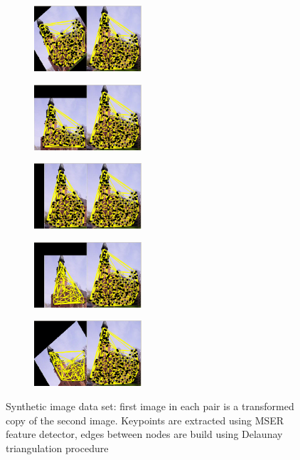 \begin{figure}[h] 
		\begin{subfigure}[b]{0.3\textwidth}
			\centering
			\includegraphics[width=4cm]{"chapter3/fig/ImageTrafo/Img_pair1"} 
			\caption{}\label{fig:ImageTrafo_initGraphs_a}
		\end{subfigure}
		\begin{subfigure}[b]{0.3\textwidth}
			\centering
			\includegraphics[width=4cm]{"chapter3/fig/ImageTrafo/Img_pair2"} 
			\caption{}
		\end{subfigure} 
		\begin{subfigure}[b]{0.3\textwidth}
			\centering
			\includegraphics[width=4cm]{"chapter3/fig/ImageTrafo/Img_pair3"}
			\caption{}
		\end{subfigure} 	
		\begin{subfigure}[b]{0.5\textwidth}
			\centering
			\includegraphics[width=4cm]{"chapter3/fig/ImageTrafo/Img_pair4"} 
			\caption{}
		\end{subfigure} 
		\begin{subfigure}[b]{0.5\textwidth}
			\centering
			\includegraphics[width=4cm]{"chapter3/fig/ImageTrafo/Img_pair5"}
			\caption{}
		\end{subfigure} 	
	\caption[Synthetic image data set]{Synthetic image data set: first image in each pair is a transformed copy of the second image. Keypoints are extracted using MSER feature detector, edges between nodes are build using Delaunay triangulation procedure}
	\label{fig:ImageTrafo_initGraphs}
\end{figure}

